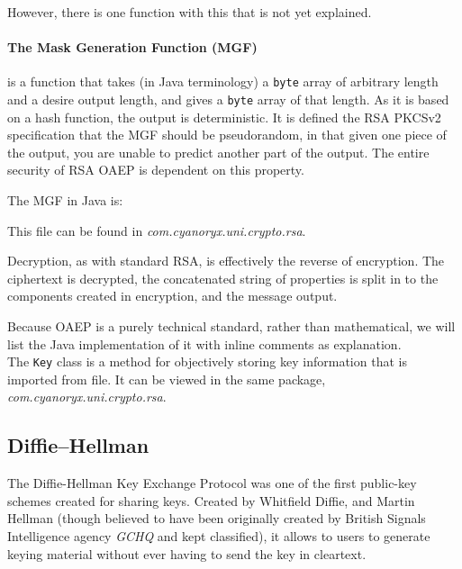    However, there is one function with this that is not yet explained.
    
    \paragraph{The Mask Generation Function (MGF)}
    
    is a function that takes (in Java terminology) a \verb!byte! array of arbitrary length and a desire output length, and gives a \verb!byte! array of that length. As it is based on a hash function, the output is deterministic. It is defined the RSA PKCSv2 specification\cite{Jonsson:2003aa} that the MGF should be pseudorandom, in that given one piece of the output, you are unable to predict another part of the output. The entire security of RSA OAEP is dependent on this property. 
    
    The MGF in Java is:
    
    
    This file can be found in \emph{com.cyanoryx.uni.crypto.rsa}.
    
    Decryption, as with standard RSA, is effectively the reverse of encryption. The ciphertext is decrypted, the concatenated string of properties is split in to the components created in encryption, and the message output.
        
    Because OAEP is a purely technical standard, rather than mathematical, we will list the Java implementation of it with inline comments as explanation. \\
    
    
    
    The \verb!Key! class is a method for objectively storing key information that is imported from file. It can be viewed in the same package, \emph{com.cyanoryx.uni.crypto.rsa}.

  \subsection{Diffie--Hellman}
  
  The Diffie-Hellman Key Exchange Protocol was one of the first public-key schemes created for sharing keys. Created by Whitfield Diffie, and Martin Hellman (though believed to have been originally created by British Signals Intelligence agency \emph{GCHQ} and kept classified), it allows to users to generate keying material without ever having to send the key in cleartext.
  
